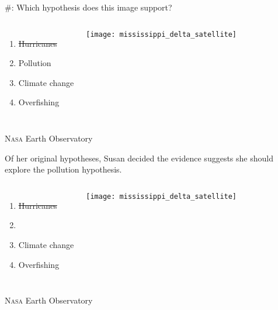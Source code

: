 \documentclass[t]{beamer}
\newcommand*{\cq}[1]{%
	\#{\lining#1}:%
}
\begin{document}
%
\begin{frame}{\cq{3} Which hypothesis does this image support?}

	\begin{columns}[t]
			\begin{enumerate}
				\item \sout{Hurricanes} 
				\item Pollution
				\item Climate change
				\item Overfishing
			\end{enumerate}
			

			\texttt{[image: mississippi\_delta\_satellite]}

	\end{columns}

	\vfilll
	
	\hfill \tiny \textsc{Nasa} Earth Observatory

\end{frame}
%

\begin{frame}{Of her original hypotheses, Susan decided the evidence suggests she should explore the pollution hypothesis.}

	\begin{columns}[t]
			\begin{enumerate}
				\item \sout{Hurricanes} %
				\item {}
				\item Climate change
				\item Overfishing
			\end{enumerate}
			

			\texttt{[image: mississippi\_delta\_satellite]}

	\end{columns}
	

	\vfilll
	
	\hfill \tiny \textsc{Nasa} Earth Observatory

\end{frame}
%
\end{document}
